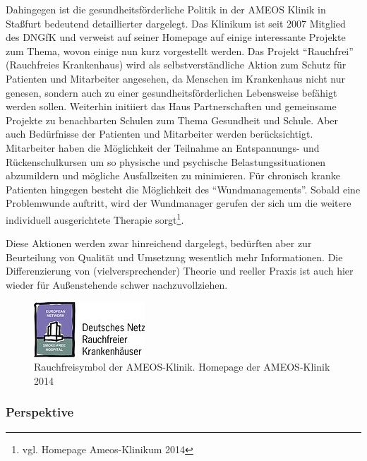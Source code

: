 Dahingegen ist die gesundheitsförderliche Politik in der AMEOS Klinik in Staßfurt bedeutend detaillierter dargelegt. Das Klinikum ist seit 2007 Mitglied des DNGfK und verweist auf seiner Homepage auf einige interessante Projekte zum Thema, wovon einige nun kurz vorgestellt werden. Das Projekt "`Rauchfrei"' (Rauchfreies Krankenhaus) wird als selbstverständliche Aktion zum Schutz für Patienten und Mitarbeiter angesehen, da Menschen im Krankenhaus nicht nur genesen, sondern auch zu einer gesundheitsförderlichen Lebensweise befähigt werden sollen. Weiterhin initiiert das Haus Partnerschaften und gemeinsame Projekte zu benachbarten Schulen zum Thema Gesundheit und Schule. Aber auch Bedürfnisse der Patienten und Mitarbeiter werden berücksichtigt. Mitarbeiter haben die Möglichkeit der Teilnahme an Entspannungs- und Rückenschulkursen um so physische und psychische Belastungssituationen abzumildern und mögliche Ausfallzeiten zu minimieren. Für chronisch kranke Patienten hingegen besteht die Möglichkeit des "`Wundmanagements"'. Sobald eine Problemwunde auftritt, wird der Wundmanager gerufen der sich um die weitere individuell ausgerichtete Therapie sorgt\footnote{vgl. Homepage Ameos-Klinikum 2014}.

Diese Aktionen werden zwar hinreichend dargelegt, bedürften aber zur Beurteilung von Qualität und Umsetzung wesentlich mehr Informationen. Die Differenzierung von (vielversprechender) Theorie und reeller Praxis ist auch hier wieder für Außenstehende schwer nachzuvollziehen.

\begin{figure}[h]
	\centering
		\includegraphics[scale=2.75]{rauchfreiymbol.jpg}
	\caption{Rauchfreisymbol der AMEOS-Klinik. Homepage der AMEOS-Klinik 2014}
	\label{fig:rauchfreiymbol}
\end{figure}

\subsubsection{Perspektive}
\label{sec:Perspektive}

